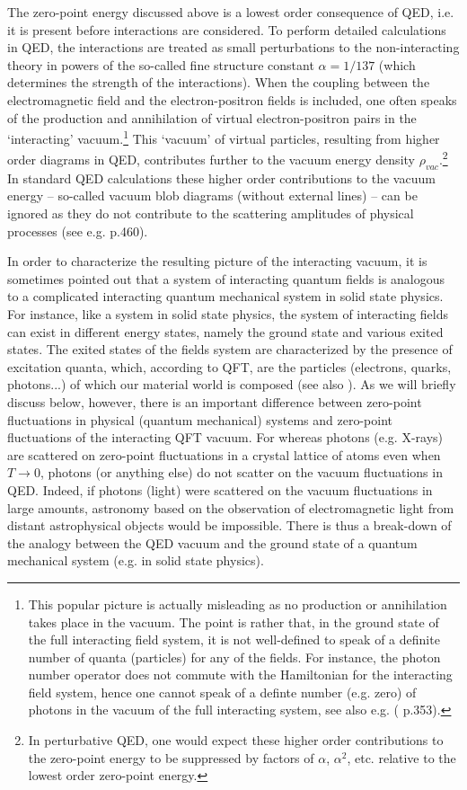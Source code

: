 \documentclass[12pt]{article}
\begin{document}
The zero-point energy discussed above is a lowest order
consequence of QED, i.e. it is present before interactions are
considered. To perform detailed calculations in QED, the
interactions are treated as small perturbations to the
non-interacting theory in powers of the so-called fine structure
constant $\alpha = 1/137$ (which determines the strength of the
interactions). When the coupling between the electromagnetic field
and the electron-positron fields is included, one often speaks of
the production and annihilation of virtual electron-positron pairs
in the `interacting' vacuum.\footnote{This popular picture is
actually misleading as no production or annihilation takes place
in the vacuum. The point is rather that, in the ground state of
the full interacting field system, it is not well-defined to speak
of a definite number of quanta (particles) for any of the fields.
For instance, the photon number operator does not commute with the
Hamiltonian for the interacting field system, hence one cannot
speak of a definte number (e.g. zero) of photons in the vacuum of
the full interacting system, see also e.g. (\cite{aitchison85}
p.353).} This `vacuum' of virtual particles, resulting from higher
order diagrams in QED, contributes further to the vacuum energy
density $\rho_{vac}$.\footnote{In perturbative QED, one would
expect these higher order contributions to the zero-point energy
to be suppressed by factors of $\alpha$, $\alpha ^2$, etc.
relative to the lowest order zero-point energy.} In standard QED
calculations these higher order contributions to the vacuum energy
-- so-called vacuum blob diagrams (without external lines) -- can
be ignored as they do not contribute to the scattering amplitudes
of physical processes (see e.g. \cite{berestetskii82} p.460).

In order to characterize the resulting picture of the interacting
vacuum, it is sometimes pointed out that a system of interacting
quantum fields is analogous to a complicated interacting quantum
mechanical system in solid state physics. For instance, like a
system in solid state physics, the system of interacting fields
can exist in different energy states, namely the ground state and
various exited states. The exited states of the fields system are
characterized by the presence of excitation quanta, which,
according to QFT, are the particles (electrons, quarks,
photons...) of which our material world is composed (see also
\cite{aitchison85}). As we will briefly discuss below, however,
there is an important difference between zero-point fluctuations
in physical (quantum mechanical) systems and zero-point
fluctuations of the interacting QFT vacuum. For whereas photons
(e.g. X-rays) are scattered on zero-point fluctuations in a
crystal lattice of atoms even when $T \rightarrow 0$, photons (or
anything else) do not scatter on the vacuum fluctuations in QED.
Indeed, if photons (light) were scattered on the vacuum
fluctuations in large amounts, astronomy based on the
observation of electromagnetic light from distant astrophysical
objects would be impossible. There is thus a break-down of the
analogy between the QED vacuum and the ground state of a quantum
mechanical system (e.g. in solid state physics).
\end{document}
